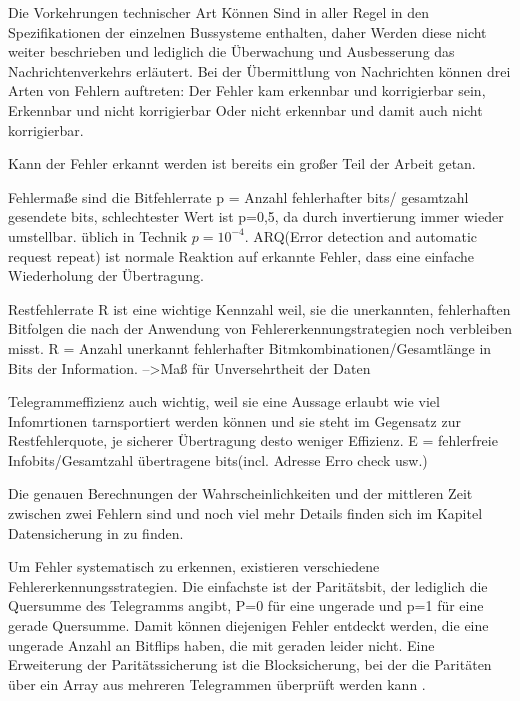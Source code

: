 Die Vorkehrungen technischer Art Können Sind in aller Regel in den Spezifikationen der einzelnen Bussysteme enthalten, daher Werden diese nicht weiter beschrieben und lediglich die Überwachung und Ausbesserung das Nachrichtenverkehrs erläutert.
Bei der Übermittlung von Nachrichten können drei Arten von Fehlern auftreten:
Der Fehler kam erkennbar und korrigierbar sein,
Erkennbar und nicht korrigierbar
Oder nicht erkennbar und damit auch nicht korrigierbar.

Kann der Fehler erkannt werden ist bereits ein großer Teil der Arbeit getan. 

Fehlermaße sind
die Bitfehlerrate p = Anzahl fehlerhafter bits/ gesamtzahl gesendete bits, schlechtester Wert ist p=0,5, da durch invertierung immer wieder umstellbar. üblich in Technik $p=10^{-4}$.
ARQ(Error detection and automatic request repeat) ist normale Reaktion auf erkannte Fehler, dass eine einfache Wiederholung der Übertragung.

Restfehlerrate R ist eine wichtige Kennzahl weil, sie die unerkannten, fehlerhaften Bitfolgen die nach der Anwendung von Fehlererkennungstrategien noch verbleiben misst. R = Anzahl unerkannt fehlerhafter Bitmkombinationen/Gesamtlänge in Bits der Information.
-->Maß für Unversehrtheit der Daten

Telegrammeffizienz auch wichtig, weil sie eine Aussage erlaubt wie viel Infomrtionen tarnsportiert werden können und sie steht im Gegensatz zur Restfehlerquote, je sicherer Übertragung desto weniger Effizienz. E = fehlerfreie Infobits/Gesamtzahl übertragene bits(incl. Adresse Erro check usw.)
\cite[S.~31ff.]{schn06}

Die genauen Berechnungen der Wahrscheinlichkeiten und der mittleren Zeit zwischen zwei Fehlern sind und noch viel mehr Details finden sich im Kapitel Datensicherung in \cite[S.~31f.]{schn06} zu finden.

Um Fehler systematisch zu erkennen, existieren verschiedene Fehlererkennungsstrategien. Die einfachste ist der Paritätsbit, der lediglich die Quersumme des Telegramms angibt, P=0 für eine ungerade und p=1 für eine gerade Quersumme. Damit können diejenigen Fehler entdeckt werden, die eine ungerade Anzahl an Bitflips haben, die mit geraden leider nicht. Eine Erweiterung der Paritätssicherung ist die Blocksicherung, bei der die Paritäten über ein Array aus mehreren Telegrammen überprüft werden kann \cite[S.~34f.]{schn06}.

